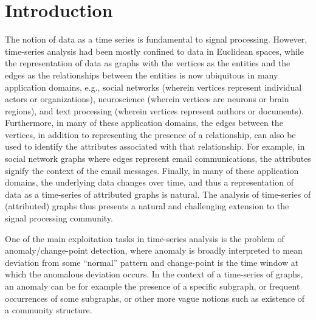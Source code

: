 \documentclass[10pt,draftclsnofoot,onecolumn]{IEEEtran}
\theoremstyle{definition}
\begin{document}
\section{Introduction}
\label{sec:introduction}
The notion of data as a time series is fundamental to signal
processing. However, time-series analysis had been mostly confined to
data in Euclidean spaces, while the representation of data as graphs
with the vertices as the entities and the edges as the relationships
between the entities is now ubiquitous in many application domains,
e.g., social networks (wherein vertices represent individual actors or
organizations), neuroscience (wherein vertices are neurons or brain
regions), and text processing (wherein vertices represent authors or
documents). Furthermore, in many of these application domains, the
edges between the vertices, in addition to representing the presence
of a relationship, can also be used to identify the attributes
associated with that relationship. For example, in social network
graphs where edges represent email communications, the attributes
signify the context of the email messages. Finally, in many of these
application domains, the underlying data changes over time, and thus a
representation of data as a time-series of attributed graphs is
natural. The analysis of time-series of (attributed) graphs thus
presents a natural and challenging extension to the signal processing
community. 

One of the main exploitation tasks in time-series analysis is the
problem of anomaly/change-point detection, where anomaly is broadly
interpreted to mean deviation from some ``normal'' pattern and
change-point is the time window at which the anomalous deviation
occurs. In the context of a time-series of graphs, an anomaly can be
for example the presence of a specific subgraph, or frequent occurrences
of some subgraphs, or other more vague notions such as existence of a
community structure.
\end{document}
